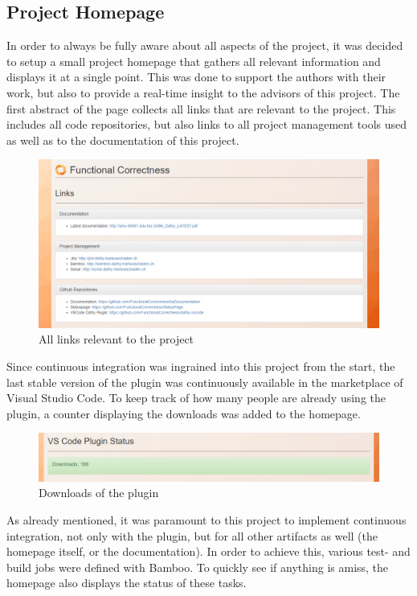 \subsection{Project Homepage}
In order to always be fully aware about all aspects of the project, it was decided to setup a small project homepage that gathers all relevant information and displays it at a single point. This was done to support the authors with their work, but also to provide a real-time insight to the advisors of this project. \newline
The first abstract of the page collects all links that are relevant to the project. This includes all code repositories, but also links to all project management tools used as well as to the documentation of this project.  \newline
\begin{figure}[H]
	\centering
	\includegraphics[width=1\textwidth]{img/homeLinks}
	\caption{All links relevant to the project}
	\label{fig:Project Links}
\end{figure}
Since continuous integration was ingrained into this project from the start, the last stable version of the plugin was continuously available in the marketplace of Visual Studio Code. To keep track of how many people are already using the plugin, a counter displaying the downloads was added to the homepage. \newline
\begin{figure}[H]
	\centering
	\includegraphics[width=1\textwidth]{img/homeCounter}
	\caption{Downloads of the plugin}
	\label{fig:Plugin Downloads}
\end{figure}
As already mentioned, it was paramount to this project to implement continuous integration, not only with the plugin, but for all other artifacts as well (the homepage itself, or the documentation). In order to achieve this, various test- and build jobs were defined with Bamboo. To quickly see if anything is amiss, the homepage also displays the status of these tasks. \newline
